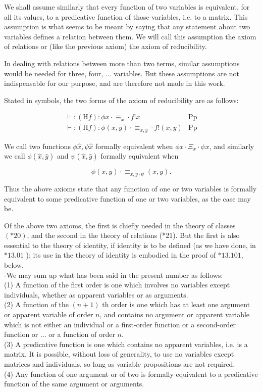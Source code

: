 \documentclass[10pt]{article}
\begin{document}
We shall assume similarly that every function of two variables is equivalent, for all its values, to a predicative function of those variables, i.e. to a matrix. This assumption is what seems to be meant by saying that any statement about two variables defines a relation between them. We will call this assumption the axiom of relations or (like the previous axiom) the axiom of reducibility.

In dealing with relations between more than two terms, similar assumptions would be needed for three, four, ... variables. But these assumptions are not indispensable for our purpose, and are therefore not made in this work.

Stated in symbols, the two forms of the axiom of reducibility are as follows:

\[
\begin{array}{ll}
\vdash:(\mathrm{H} f): \phi x \cdot \equiv_{x} \cdot f!x & \mathrm{Pp} \\
\vdash:(\mathrm{H} f): \phi(x, y) \cdot \equiv_{x, y} \cdot f!(x, y) & \mathrm{Pp} \tag{$* 12 \cdot 11$}
\end{array}
\]

We call two functions $\phi \hat{x}, \psi \hat{x}$ formally equivalent when $\phi x \cdot \Xi_{x} \cdot \psi x$, and similarly we call $\phi(\hat{x}, \hat{y})$ and $\psi(\hat{x}, \hat{y})$ formally equivalent when

$$
\phi(x, y) \cdot \equiv_{x, y \cdot \psi}(x, y) .
$$

Thus the above axioms state that any function of one or two variables is formally equivalent to some predicative function of one or two variables, as the case may be.

Of the above two axioms, the first is chiefly needed in the theory of classes $(* 20)$, and the second in the theory of relations (*21). But the first is also essential to the theory of identity, if identity is to be defined (as we have done, in $* 13.01$ ); its use in the theory of identity is embodied in the proof of $* 13.101$, below.\\
-We may sum up what has been said in the present number as follows:\\
(1) A function of the first order is one which involves no variables except individuals, whether as apparent variables or as arguments.\\
(2) A function of the $(n+1)$ th order is one which has at least one argument or apparent variable of order $n$, and contains no argument or apparent variable which is not either an individual or a first-order function or a second-order function or ... or a function of order $n$.\\
(3) A predicative function is one which contains no apparent variables, i.e. is a matrix. It is possible, without loss of generality, to use no variables except matrices and individuals, so long as variable propositions are not required.\\
(4) Any function of one argument or of two is formally equivalent to a predicative function of the same argument or arguments.
\end{document}
